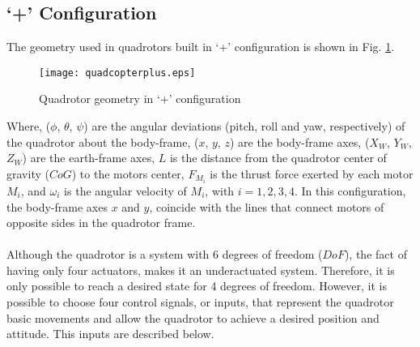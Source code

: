 \subsection{`+' Configuration}
The geometry used in quadrotors built in `+' configuration is shown in Fig. \ref{fig:quadcopterplus}.
\\
\begin{figure}[H]
\begin{center}
  \texttt{[image: quadcopterplus.eps]}
\caption{Quadrotor geometry in `+' configuration} 
    \label{fig:quadcopterplus}
    \end{center}
\end{figure}
Where, ($\phi$, $\theta$, $\psi$) are the angular deviations (pitch, roll and yaw, respectively) of the quadrotor about the body-frame,
 ($x$, $y$, $z$) are the body-frame axes,  ($X_W$, $Y_W$, $Z_W$) are the earth-frame axes, $L$ is the distance from the quadrotor center of gravity ($CoG$) to the motors center, $F_{M_i}$ is the thrust force exerted by each motor $M_i$, and $\omega_i$ is the angular velocity of $M_i$, with $i = 1,2,3,4$. In this configuration, the body-frame axes $x$ and $y$, coincide with the lines that connect motors of opposite sides in the quadrotor frame.
\\\\
Although the quadrotor is a system with 6 degrees of freedom ($DoF$), the fact of having only four actuators, makes it an underactuated system. Therefore, it is only possible to reach a desired state for 4 degrees of freedom. However, it is possible to choose four control signals, or inputs, that represent the quadrotor basic movements and allow the quadrotor to achieve a desired position and attitude. This inputs are described below.
